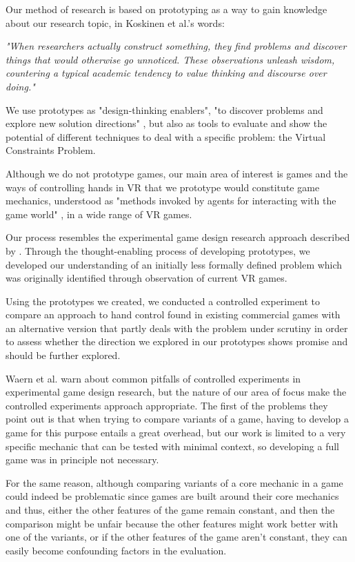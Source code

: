 Our method of research is based on prototyping as a way to gain knowledge about our research topic, in Koskinen et al.'s words:

\begin{displayquote}
\textit{"When researchers actually construct something, they find problems and discover things that would otherwise go unnoticed. These observations unleash wisdom, countering a typical academic tendency to value thinking and discourse over doing."} \parencite{Koskinen2011}
\end{displayquote}

We use prototypes as "design-thinking enablers", "to discover problems and explore new solution directions" \parencite{Lim2008}, but also as tools to evaluate and show the potential of different techniques to deal with a specific problem: the Virtual Constraints Problem.

Although we do not prototype games, our main area of interest is games and the ways of controlling hands in VR that we prototype would constitute game mechanics, understood as "methods invoked by agents for interacting with the game world" \parencite{Sicart2008}, in a wide range of VR games.

Our process resembles the experimental game design research approach described by \parencite{Waern2015}. Through the thought-enabling process of developing prototypes, we developed our understanding of an initially less formally defined problem which was originally identified through observation of current VR games.

Using the prototypes we created, we conducted a controlled experiment \parencite{Waern2015} to compare an approach to hand control found in existing commercial games with an alternative version that partly deals with the problem under scrutiny in order to assess whether the direction we explored in our prototypes shows promise and should be further explored.

Waern et al. warn about common pitfalls of controlled experiments in experimental game design research, but the nature of our area of focus make the controlled experiments approach appropriate. The first of the problems they point out is that when trying to compare variants of a game, having to develop a game for this purpose entails a great overhead, but our work is limited to a very specific mechanic that can be tested with minimal context, so developing a full game was in principle not necessary.

For the same reason, although comparing variants of a core mechanic in a game could indeed be problematic since games are built around their core mechanics and thus, either the other features of the game remain constant, and then the comparison might be unfair because the other features might work better with one of the variants, or if the other features of the game aren't constant, they can easily become confounding factors in the evaluation.

